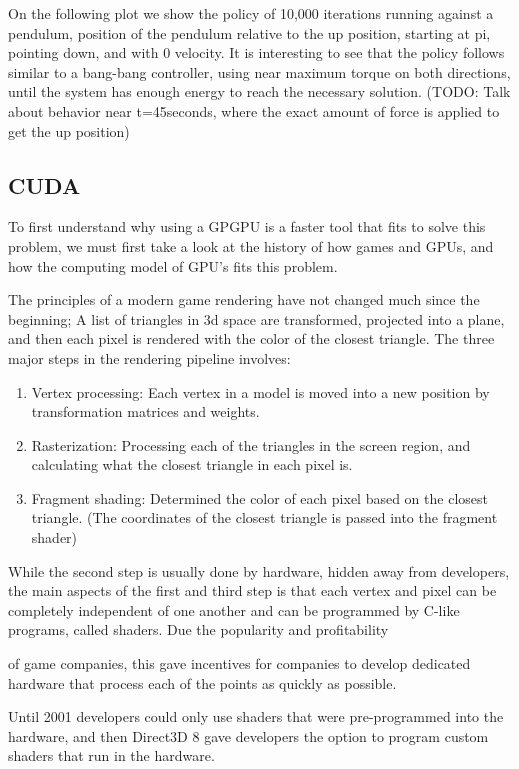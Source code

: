 \documentclass{article}
\begin{document}
On the following plot we show the policy of 10,000 iterations running against a pendulum, position of the pendulum relative to the up position, starting at pi, pointing down, and with 0 velocity. It is interesting to see that the policy follows similar to a bang-bang controller, using near maximum torque on both directions, until the system has enough energy to reach the necessary solution. (TODO: Talk about behavior near t=45seconds, where the exact amount of force is applied to get the up position)

\subsection{CUDA}

To first understand why using a GPGPU is a faster tool that fits to solve this problem, we must first take a look at the history of how games and GPUs, and how the computing model of GPU’s fits this problem.

The principles of a modern game rendering have not changed much since the beginning; A list of triangles in 3d space are transformed, projected into a plane, and then each pixel is rendered with the color of the closest triangle. The three major steps in the rendering pipeline involves:

\begin{enumerate}
\item Vertex processing: Each vertex in a model is moved into a new position by transformation matrices and weights.
\item Rasterization: Processing each of the triangles in the screen region, and calculating what the closest triangle in each pixel is.
\item Fragment shading: Determined the color of each pixel based on the closest triangle. (The coordinates of the closest triangle is passed into the fragment shader)
\end{enumerate}

While the second step is usually done by hardware, hidden away from developers, the main aspects of the first and third step is that each vertex and pixel can be completely independent of one another and can be programmed by C-like programs, called shaders. Due the popularity and profitability

of game companies, this gave incentives for companies to develop dedicated hardware that process each of the points as quickly as possible.

Until 2001 developers could only use shaders that were pre-programmed into the hardware, and then Direct3D 8 \cite{wiki:direct3d} gave developers the option to program custom shaders that run in the hardware.
\end{document}
